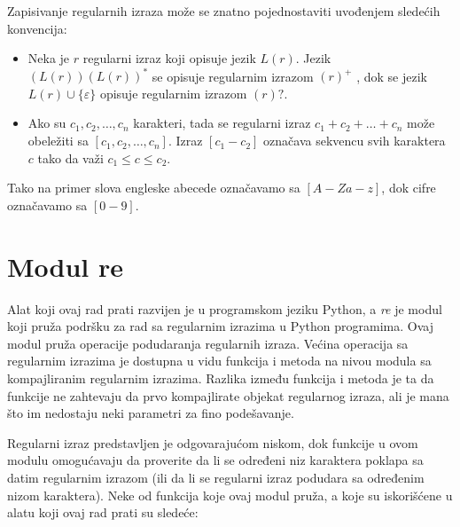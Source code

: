\documentclass[12pt,oneside]{memoir}
\theoremstyle{plain}
\theoremstyle{definition}
\begin{document}
Zapisivanje regularnih izraza može se znatno pojednostaviti uvođenjem sledećih konvencija:
\begin{itemize}
\item Neka je $r$ regularni izraz koji opisuje jezik $L(r)$. Jezik $(L(r))(L(r))^*$ se opisuje regularnim izrazom $(r)^+$ , dok se jezik $L(r) \cup \{\varepsilon\}$ opisuje regularnim izrazom $(r)?$.
\item Ako su $c_1, c_2, …, c_n$ karakteri, tada se regularni izraz $c_1 + c_2 + … + c_n$ može obeležiti sa $[c_1, c_2, …, c_n]$. Izraz $[c_1-c_2]$ označava sekvencu svih karaktera $c$ tako da važi $c_1 \leq c \leq c_2$.
\end{itemize}

Tako na primer slova engleske abecede označavamo sa $[A-Za-z]$, dok cifre označavamo sa $[0-9]$.
 
\section{Modul re}

Alat koji ovaj rad prati razvijen je u programskom jeziku Python, a \textit{re} je modul koji pruža podršku za rad sa regularnim izrazima u Python programima. Ovaj modul pruža operacije podudaranja regularnih izraza. Većina operacija sa regularnim izrazima je dostupna u vidu funkcija i metoda na nivou modula sa kompajliranim regularnim izrazima. Razlika između funkcija i metoda je ta da funkcije ne zahtevaju da prvo kompajlirate objekat regularnog izraza, ali je mana što im nedostaju neki parametri za fino podešavanje. 

Regularni izraz predstavljen je odgovarajućom niskom, dok funkcije u ovom modulu omogućavaju da proverite da li se određeni niz karaktera poklapa sa datim regularnim izrazom (ili da li se regularni izraz podudara sa određenim nizom karaktera).
Neke od funkcija koje ovaj modul pruža, a koje su iskorišćene u alatu koji ovaj rad prati su sledeće:
\end{document}
